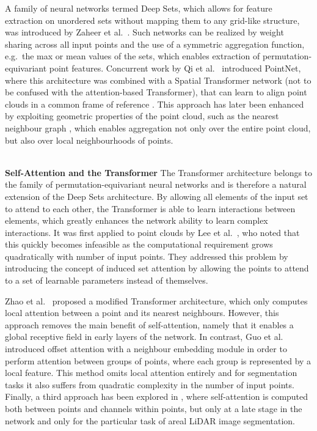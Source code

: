 \documentclass[a4paper,conference]{IEEEtran}
\begin{document}
A family of neural networks termed Deep Sets, which allows for feature extraction on unordered sets without mapping them to any grid-like structure, was introduced by Zaheer et al.\ \cite{zaheer2017deep}. Such networks can be realized by weight sharing across all input points and the use of a symmetric aggregation function, e.g.\ the max or mean values of the sets, which enables extraction of permutation-equivariant point features. Concurrent work by Qi et al.\ \cite{qi2017pointnet} introduced PointNet, where this architecture was combined with a Spatial Transformer network \cite{jaderberg2015spatial} (not to be confused with the attention-based Transformer), that can learn to align point clouds in a common frame of reference \cite{qi2017pointnet}. This approach has later been enhanced by exploiting geometric properties of the point cloud, such as the nearest neighbour graph \cite{qi2017pointnet++, wang2019dynamic}, which enables aggregation not only over the entire point cloud, but also over local neighbourhoods of points. \\~\

\noindent \textbf{Self-Attention and the Transformer} The Transformer architecture \cite{vaswani2017attention} belongs to the family of permutation-equivariant neural networks and is therefore a natural extension of the Deep Sets architecture. By allowing all elements of the input set to attend to each other, the Transformer is able to learn interactions between elements, which greatly enhances the network ability to learn complex interactions. It was first applied to point clouds by Lee et al.\ \cite{lee2019set}, who noted that this quickly becomes infeasible as the computational requirement grows quadratically with number of input points. They addressed this problem by introducing the concept of induced set attention by allowing the points to attend to a set of learnable parameters instead of themselves.

Zhao et al.\ \cite{zhao2021point} proposed a modified Transformer architecture, which only computes local attention between a point and its nearest neighbours. However, this approach removes the main benefit of self-attention, namely that it enables a global receptive field in early layers of the network. In contrast, Guo et al.\ \cite{guo2021pct} introduced offset attention with a neighbour embedding module in order to perform attention between groups of points, where each group is represented by a local feature. This method omits local attention entirely and for segmentation tasks it also suffers from quadratic complexity in the number of input points. Finally, a third approach has been explored in \cite{chen2020dapnet}, where self-attention is computed both between points and channels within points, but only at a late stage in the network and only for the particular task of areal LiDAR image segmentation. 
\end{document}
